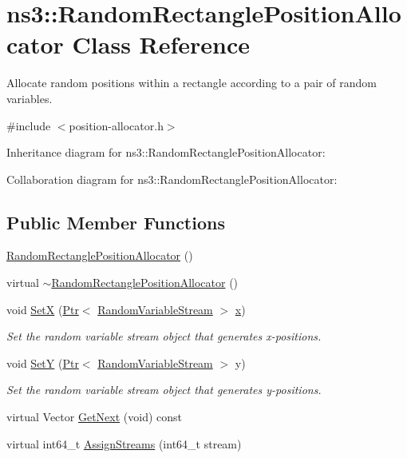 \hypertarget{classns3_1_1RandomRectanglePositionAllocator}{}\section{ns3\+:\+:Random\+Rectangle\+Position\+Allocator Class Reference}
\label{classns3_1_1RandomRectanglePositionAllocator}


Allocate random positions within a rectangle according to a pair of random variables.  




{\ttfamily \#include $<$position-\/allocator.\+h$>$}



Inheritance diagram for ns3\+:\+:Random\+Rectangle\+Position\+Allocator\+:


Collaboration diagram for ns3\+:\+:Random\+Rectangle\+Position\+Allocator\+:
\subsection*{Public Member Functions}
\begin{DoxyCompactItemize}
\item 
\hyperlink{classns3_1_1RandomRectanglePositionAllocator_a2f921e76e16f4918c0bdb57b3d02a2e7}{Random\+Rectangle\+Position\+Allocator} ()
\item 
virtual \hyperlink{classns3_1_1RandomRectanglePositionAllocator_a3bb47ad9ea4d1e6a3504db1b171d442c}{$\sim$\+Random\+Rectangle\+Position\+Allocator} ()
\item 
void \hyperlink{classns3_1_1RandomRectanglePositionAllocator_ad96b289ffb0f11b5dfc2a191802cb9fc}{SetX} (\hyperlink{classns3_1_1Ptr}{Ptr}$<$ \hyperlink{classns3_1_1RandomVariableStream}{Random\+Variable\+Stream} $>$ \hyperlink{lte__link__budget__x2__handover__measures_8m_a9336ebf25087d91c818ee6e9ec29f8c1}{x})
\begin{DoxyCompactList}\small\item\em Set the random variable stream object that generates x-\/positions. \end{DoxyCompactList}\item 
void \hyperlink{classns3_1_1RandomRectanglePositionAllocator_a5b3b6b553f705da163a47d5d791a738c}{SetY} (\hyperlink{classns3_1_1Ptr}{Ptr}$<$ \hyperlink{classns3_1_1RandomVariableStream}{Random\+Variable\+Stream} $>$ y)
\begin{DoxyCompactList}\small\item\em Set the random variable stream object that generates y-\/positions. \end{DoxyCompactList}\item 
virtual Vector \hyperlink{classns3_1_1RandomRectanglePositionAllocator_a7aa1ddd6eb4fb04bbf010fd37a5da047}{Get\+Next} (void) const 
\item 
virtual int64\+\_\+t \hyperlink{classns3_1_1RandomRectanglePositionAllocator_a2f6b9933c19cc46dd4becb1233eee7f7}{Assign\+Streams} (int64\+\_\+t stream)
\end{DoxyCompactItemize}
